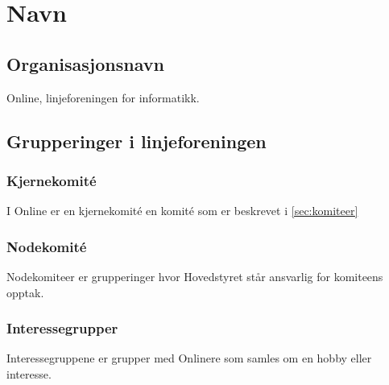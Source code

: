 \chapter{Navn}
\section{Organisasjonsnavn}
\vspace{23pt}
Online, linjeforeningen for informatikk.




\section{Grupperinger i linjeforeningen}
\vspace{23pt}

\subsection{Kjernekomité}

I Online er en kjernekomité en komité som er beskrevet i \ref{sec:komiteer}

\subsection{Nodekomité}

Nodekomiteer er grupperinger hvor Hovedstyret står ansvarlig for komiteens opptak.


\subsection{Interessegrupper}

Interessegruppene er grupper med Onlinere som samles om en hobby eller interesse.

